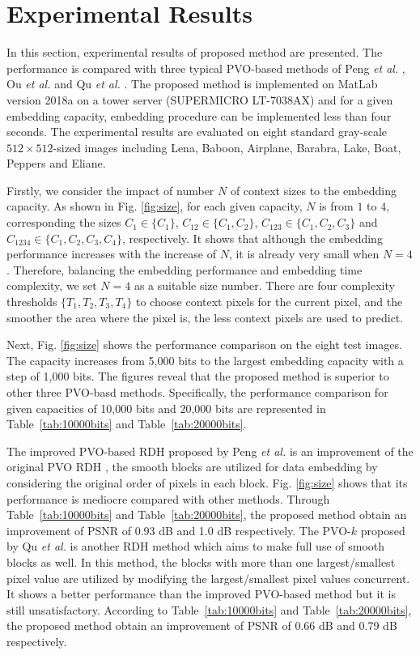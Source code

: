 \documentclass[review,3p,10pt,sort&compress]{elsarticle}
\begin{document}
\section{Experimental Results}\label{sec:4}
In this section, experimental results of proposed method are presented. The performance is compared with three typical PVO-based methods of Peng \emph{et al.} \cite{Peng2014IPVO}, Ou \emph{et al.} \cite{Ou2014PVOk} and Qu \emph{et al.} \cite{Qu2015PPVO}. The proposed method is implemented on MatLab version 2018a on a tower server (SUPERMICRO LT-7038AX) and for a given embedding capacity, embedding procedure can be implemented less than four seconds. The experimental results are evaluated on eight standard gray-scale $512 \times 512$-sized images including Lena, Baboon, Airplane, Barabra, Lake, Boat, Peppers and Eliane.

Firstly, we consider the impact of number $N$ of context sizes to the embedding capacity. As shown in Fig. \ref{fig:size}, for each given capacity, $N$ is from $1$ to $4$, corresponding the sizes $C_1 \in \{C_1\}$, $C_{12} \in \{C_1, C_2\}$, $C_{123} \in \{C_1, C_2, C_3\}$ and $C_{1234} \in \{C_1, C_2, C_3, C_4\}$, respectively. It shows that although the embedding performance increases with the increase of $N$, it is already very small when $N = 4$. Therefore, balancing the embedding performance and embedding time complexity, we set $N = 4$ as a suitable size number. There are four complexity thresholds $\{T_1, T_2, T_3, T_4\}$ to choose context pixels for the current pixel, and the smoother the area where the pixel is, the less context pixels are used to predict.

Next, Fig. \ref{fig:size} shows the performance comparison on the eight test images. The capacity increases from 5,000 bits to the largest embedding capacity with a step of 1,000 bits. The figures reveal that the proposed method is superior to other three PVO-basd methods. Specifically, the performance comparison for given capacities of 10,000 bits and 20,000 bits are represented in Table~\ref{tab:10000bits} and Table~\ref{tab:20000bits}.

The improved PVO-based RDH proposed by Peng \emph{et al.} \cite{Peng2014IPVO} is an improvement of the original PVO RDH \cite{Li2013PVO}, the smooth blocks are utilized for data embedding by considering the original order of pixels in each block. Fig. \ref{fig:size} shows that its performance is mediocre compared with other methods. Through Table~\ref{tab:10000bits} and Table~\ref{tab:20000bits}, the proposed method obtain an improvement of PSNR of 0.93 dB and 1.0 dB respectively. The PVO-$k$ proposed by Qu \emph{et al.} \cite{Qu2015PPVO} is another RDH method which aims to make full use of smooth blocks as well. In this method, the blocks with more than one largest/smallest pixel value are utilized by modifying the largest/smallest pixel values concurrent. It shows a better performance than the improved PVO-based method but it is still unsatisfactory. According to Table~\ref{tab:10000bits} and Table~\ref{tab:20000bits}, the proposed method obtain an improvement of PSNR of 0.66 dB and 0.79 dB respectively.
\end{document}
